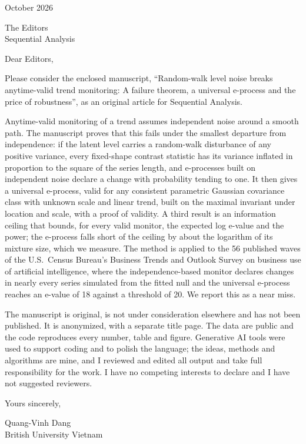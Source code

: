 \documentclass[11pt]{article}
\begin{document}
 October 2026

\medskip\noindent The Editors\\
Sequential Analysis

\medskip\noindent Dear Editors,

\medskip\noindent Please consider the enclosed manuscript, ``Random-walk level noise breaks anytime-valid trend monitoring: A failure theorem, a universal e-process and the price of robustness'', as an original article for Sequential Analysis.

\medskip\noindent Anytime-valid monitoring of a trend assumes independent noise around a smooth path. The manuscript proves that this fails under the smallest departure from independence: if the latent level carries a random-walk disturbance of any positive variance, every fixed-shape contrast statistic has its variance inflated in proportion to the square of the series length, and e-processes built on independent noise declare a change with probability tending to one. It then gives a universal e-process, valid for any consistent parametric Gaussian covariance class with unknown scale and linear trend, built on the maximal invariant under location and scale, with a proof of validity. A third result is an information ceiling that bounds, for every valid monitor, the expected log e-value and the power; the e-process falls short of the ceiling by about the logarithm of its mixture size, which we measure. The method is applied to the 56 published waves of the U.S.\ Census Bureau's Business Trends and Outlook Survey on business use of artificial intelligence, where the independence-based monitor declares changes in nearly every series simulated from the fitted null and the universal e-process reaches an e-value of 18 against a threshold of 20. We report this as a near miss.

\medskip\noindent The manuscript is original, is not under consideration elsewhere and has not been published. It is anonymized, with a separate title page. The data are public and the code reproduces every number, table and figure. Generative AI tools were used to support coding and to polish the language; the ideas, methods and algorithms are mine, and I reviewed and edited all output and take full responsibility for the work. I have no competing interests to declare and I have not suggested reviewers.

\medskip\noindent Yours sincerely,

\medskip\noindent Quang-Vinh Dang\\
British University Vietnam
\end{document}
